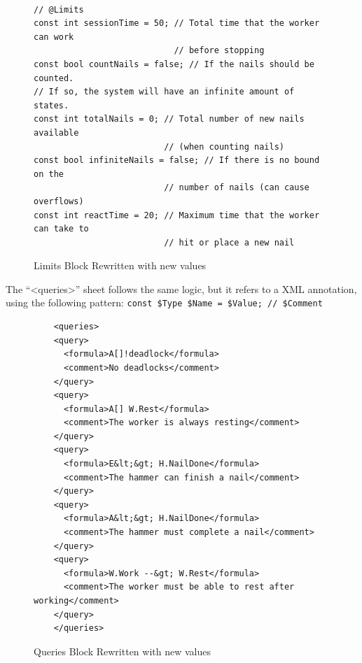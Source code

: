 \paragraph{}


\begin{figure}[H]
\centering
\begin{minipage}{2.9\linewidth}
\begin{lstlisting}[language=MOREUPPAAL]
// @Limits
const int sessionTime = 50; // Total time that the worker can work
                            // before stopping 
const bool countNails = false; // If the nails should be counted. 
// If so, the system will have an infinite amount of states. 
const int totalNails = 0; // Total number of new nails available
                          // (when counting nails) 
const bool infiniteNails = false; // If there is no bound on the
                          // number of nails (can cause overflows) 
const int reactTime = 20; // Maximum time that the worker can take to
                          // hit or place a new nail 
\end{lstlisting}
\end{minipage}
\caption{Limits Block Rewritten with new values}
\label{fig:worker-config}
\end{figure}

The ``<queries>'' sheet follows the same logic, but it refers to a XML annotation, using the following pattern: \texttt{\footnotesize const \$Type \$Name = \$Value; // \$Comment}

\begin{figure}[H]
\centering
\begin{minipage}{0.9\linewidth}
{\footnotesize
\begin{verbatim}
    <queries>
    <query>
      <formula>A[]!deadlock</formula>
      <comment>No deadlocks</comment>
    </query>
    <query>
      <formula>A[] W.Rest</formula>
      <comment>The worker is always resting</comment>
    </query>
    <query>
      <formula>E&lt;&gt; H.NailDone</formula>
      <comment>The hammer can finish a nail</comment>
    </query>
    <query>
      <formula>A&lt;&gt; H.NailDone</formula>
      <comment>The hammer must complete a nail</comment>
    </query>
    <query>
      <formula>W.Work --&gt; W.Rest</formula>
      <comment>The worker must be able to rest after working</comment>
    </query>
    </queries>
\end{verbatim}
}
\end{minipage}
\caption{Queries Block Rewritten with new values}
\label{fig:worker-config}
\end{figure}

